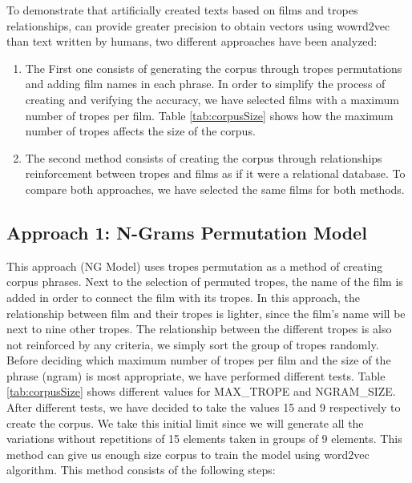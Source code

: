 \documentclass[letterpaper]{article}
\begin{document}
	
	To demonstrate that artificially created texts based on films and tropes relationships, can provide greater precision to obtain vectors using wowrd2vec than text written by humans, two different approaches have been analyzed:
	\begin{enumerate}
	\item The First one consists of generating the corpus through tropes permutations and adding film names in each phrase. In order to simplify the process of creating and verifying the accuracy, we have selected films with a maximum number of tropes per film. Table \ref{tab:corpusSize} shows how the maximum number of tropes affects the size of the corpus.
	
	\item The second method consists of creating the corpus through relationships reinforcement between tropes and films as if it were a relational database. To compare both approaches, we have selected the same films for both methods.
	\end{enumerate}
	
	\subsection{Approach 1: N-Grams Permutation Model}

	This approach (NG Model) uses tropes permutation as a method of creating corpus phrases. Next to the selection of permuted tropes, the name of the film is added in order to connect the film with its tropes. In this approach, the relationship between film and their tropes is lighter, since the film's name will be next to nine other tropes. The relationship between the different tropes is also not reinforced by any criteria, we simply sort the group of tropes randomly. Before deciding which maximum number of tropes per film and the size of the phrase (ngram) is most appropriate, we have performed different tests. Table \ref{tab:corpusSize} shows different values for MAX\_TROPE and NGRAM\_SIZE. After different tests, we have decided to take the values 15 and 9 respectively to create the corpus. We take this
	initial limit since we will generate all the variations
	without repetitions of 15 elements taken in groups of 9
	elements. This method can give us enough size corpus to train the model using word2vec algorithm. This method consists of the following steps:
	
\end{document}
